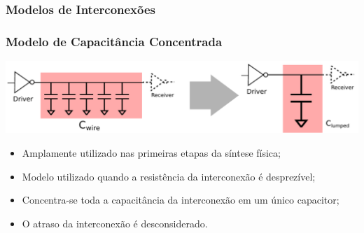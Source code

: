 \documentclass[10pt,a4paper]{beamer}
\begin{document}
			\subsubsection*{Modelos de Interconexões}
%					
%					
				
				\begin{frame}
					\frametitle{Modelo de Capacitância Concentrada}
					\begin{center}
						\includegraphics[width=\textwidth]{img/lumped_c.pdf} 
					\end{center}
					\begin{itemize}
						\item Amplamente utilizado nas primeiras etapas da síntese física;
						\item Modelo utilizado quando a resistência da interconexão é desprezível;
						\item Concentra-se toda a capacitância da interconexão em um único capacitor;
						\item O atraso da interconexão é desconsiderado.
					\end{itemize}							
				\end{frame}
				
\end{document}
